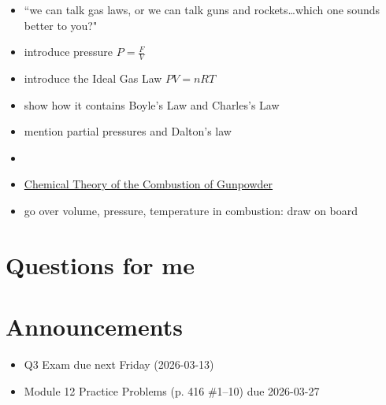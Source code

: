\documentclass[10pt, oneside]{article}   	%
\begin{document}
\begin{itemize}
\item ``we can talk gas laws, or we can talk guns and rockets\ldots which one sounds better to you?"
\item introduce pressure $P = \frac{F}{V}$
\item introduce the Ideal Gas Law $P V = n R T$
\item show how it contains Boyle's Law and Charles's Law
\item mention partial pressures and Dalton's law
\item {}  
\item \href{https://www.usni.org/magazines/proceedings/1879/december/chemical-theory-combustion-gunpowder}{Chemical Theory of the Combustion of Gunpowder}
\item go over volume, pressure, temperature in combustion: draw on board
\end{itemize}


\section*{Questions for me}

\section*{Announcements}

\begin{itemize}
\item Q3 Exam due next Friday (2026-03-13)
\item Module 12 Practice Problems (p. 416 \#1--10) due 2026-03-27
\end{itemize}
\end{document}
